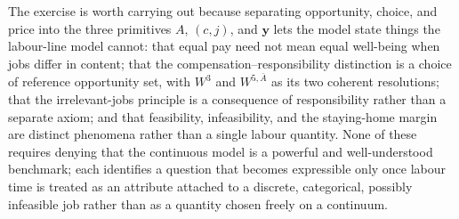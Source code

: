 The exercise is worth carrying out because separating opportunity, choice, and
price into the three primitives $A$, $(c,j)$, and $\mathbf y$ lets the model
state things the labour-line model cannot: that equal pay need not mean equal
well-being when jobs differ in content; that the compensation--responsibility
distinction is a choice of reference opportunity set, with $W^3$ and
$W^{5,\bar A}$ as its two coherent resolutions; that the irrelevant-jobs
principle is a consequence of responsibility rather than a separate axiom; and
that feasibility, infeasibility, and the staying-home margin are distinct
phenomena rather than a single labour quantity. None of these requires denying
that the continuous model is a powerful and well-understood benchmark; each
identifies a question that becomes expressible only once labour time is treated
as an attribute attached to a discrete, categorical, possibly infeasible job
rather than as a quantity chosen freely on a continuum.
